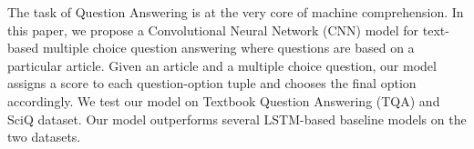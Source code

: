 The task of Question Answering is at the very core of machine comprehension. In this paper, we propose a Convolutional Neural Network (CNN) model for text-based multiple choice question answering where questions are based on a particular article. Given an article and a multiple choice question, our model assigns a score to each question-option tuple and chooses the final option accordingly. We test our model on Textbook Question Answering (TQA) and SciQ dataset. Our model outperforms several LSTM-based baseline models on the two datasets.
